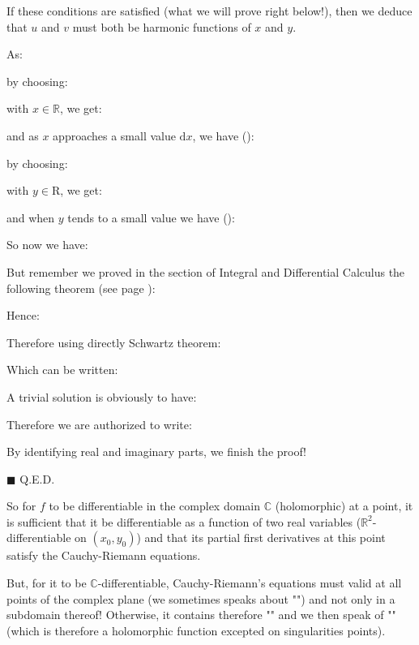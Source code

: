 	\begin{theorem}
	If these conditions are satisfied (what we will prove right below!), then we deduce that $u$ and $v$ must both be harmonic functions of $x$ and $y$.
	\end{theorem}
	\begin{dem}
	As:
	
	by choosing:
	
	with $x \in \mathbb{R}$, we get:
	
	and as $x$ approaches a small value $\mathrm{d}x$, we have ():
	
	by choosing:
	
	with $y \in \mathrm{R}$, we get:
	
	and when $y$ tends to a small value we have ():
	
	So now we have:
	
	But remember we proved in the section of Integral and Differential Calculus the following theorem (see page \pageref{Schwarz theorem}):
	
	Hence:
	
	Therefore using directly Schwartz theorem:
	
	Which can be written:
	
	A trivial solution is obviously to have:
	
	Therefore we are authorized to write:
	
	By identifying real and imaginary parts, we finish the proof!
	\begin{flushright}
		$\blacksquare$  Q.E.D.
	\end{flushright}
	\end{dem}
	So for $f$ to be differentiable in the complex domain $\mathbb{C}$ (holomorphic) at a point, it is sufficient that it be differentiable as a function of two real variables ($\mathbb{R}^2$-differentiable on $(x_0,y_0)$) and that its partial first derivatives at this point satisfy the Cauchy-Riemann equations.
	
	But, for it to be $\mathbb{C}$-differentiable, Cauchy-Riemann's equations must valid at all points of the complex plane (we sometimes speaks about "") and not only in a subdomain thereof! Otherwise, it contains therefore "" and we then speak of "\label{meromorphic function}" (which is therefore a holomorphic function excepted on singularities points).
	
